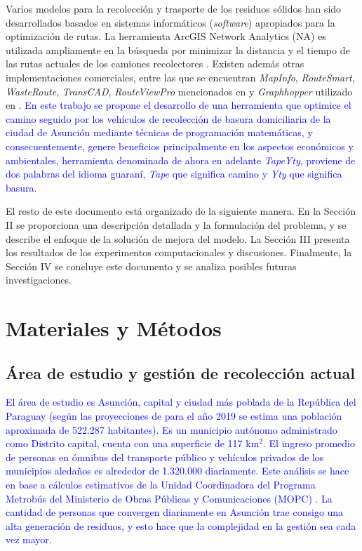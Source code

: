 \documentclass[spanish, conference]{IEEEtran}
\begin{document}
{Varios modelos para la recolección y trasporte de los residuos sólidos han sido desarrollados basados en sistemas informáticos (\textit{software}) apropiados para la optimización de rutas. La herramienta ArcGIS Network Analytics (NA) es utilizada ampliamente en la búsqueda por minimizar la distancia y el tiempo de las rutas actuales de los camiones recolectores \cite{Kallel2016UsingTunisia} \cite{Malakahmad2014SolidMalaysia}. Existen además otras implementaciones comerciales, entre las que se encuentran \textit{MapInfo}, \textit{RouteSmart}, \textit{WasteRoute}, \textit{TransCAD}, \textit{RouteViewPro} mencionados en \cite{Kallel2016UsingTunisia} y \textit{Graphhopper} utilizado en \cite{Lozano2018SmartOptimization}.
\textcolor{blue}{En este trabajo se propone el desarrollo de una herramienta que optimice el camino seguido por los vehículos de recolección de basura domiciliaria de la ciudad de Asunción mediante técnicas de programación matemáticas, y consecuentemente, genere beneficios principalmente en los aspectos económicos y ambientales, herramienta denominada de ahora en adelante \textit{TapeYty}, proviene de dos palabras del idioma guaraní, \textit{Tape} que significa camino y \textit{Yty} que significa basura.}

El resto de este documento está organizado de la siguiente manera. En la Sección II se proporciona una descripción detallada y la formulación del problema, y se describe el enfoque de la solución de mejora del modelo. La Sección III presenta los resultados de los experimentos computacionales y discusiones. Finalmente, la Sección IV se concluye este documento y se analiza posibles futuras investigaciones.

\section{Materiales y Métodos}

\subsection{Área de estudio y gestión de recolección actual}

\textcolor{blue}{El área de estudio es Asunción, capital y ciudad más poblada de la República del Paraguay (según las proyecciones de \cite{DireccionGeneraldeEstadistica2015Paraguay2000-2025} para el año 2019 se estima una población aproximada de 522.287 habitantes). Es un municipio autónomo administrado como Distrito capital, cuenta con una superficie de 117 km$^{2}$. El ingreso promedio de personas en ómnibus del transporte público y vehículos privados de los municipios aledaños es alrededor de 1.320.000 diariamente. Este análisis se hace en base a cálculos estimativos de la Unidad Coordinadora del Programa Metrobús del Ministerio de Obras Públicas y Comunicaciones (MOPC) \cite{DiarioABCColor2016PorColor}. La cantidad de personas que convergen diariamente en Asunción trae consigo una alta generación de residuos, y esto hace que la complejidad en la gestión sea cada vez mayor. }

}
\end{document}

